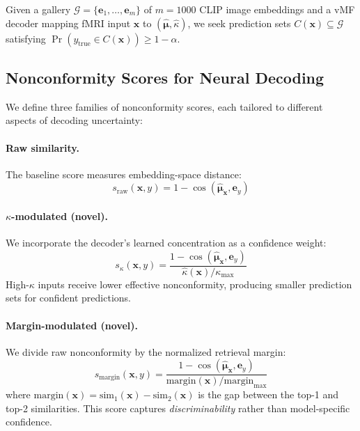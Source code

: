 \documentclass{article}
\begin{document}
Given a gallery $\mathcal{G} = \{\mathbf{e}_1, \ldots, \mathbf{e}_m\}$ of $m=1000$ CLIP image embeddings and a vMF decoder mapping fMRI input $\mathbf{x}$ to $(\hat{\boldsymbol{\mu}}, \hat{\kappa})$, we seek prediction sets $C(\mathbf{x}) \subseteq \mathcal{G}$ satisfying $\Pr(y_{\text{true}} \in C(\mathbf{x})) \geq 1 - \alpha$.

\subsection{Nonconformity Scores for Neural Decoding}
\label{sec:scores}

We define three families of nonconformity scores, each tailored to different aspects of decoding uncertainty:

\paragraph{Raw similarity.} The baseline score measures embedding-space distance:
\begin{equation}
    s_{\text{raw}}(\mathbf{x}, y) = 1 - \cos(\hat{\boldsymbol{\mu}}_\mathbf{x}, \mathbf{e}_y)
\end{equation}

\paragraph{$\kappa$-modulated (novel).} We incorporate the decoder's learned concentration as a confidence weight:
\begin{equation}
    s_{\kappa}(\mathbf{x}, y) = \frac{1 - \cos(\hat{\boldsymbol{\mu}}_\mathbf{x}, \mathbf{e}_y)}{\hat{\kappa}(\mathbf{x}) / \kappa_{\max}}
\end{equation}
High-$\kappa$ inputs receive lower effective nonconformity, producing smaller prediction sets for confident predictions.

\paragraph{Margin-modulated (novel).} We divide raw nonconformity by the normalized retrieval margin:
\begin{equation}
    s_{\text{margin}}(\mathbf{x}, y) = \frac{1 - \cos(\hat{\boldsymbol{\mu}}_\mathbf{x}, \mathbf{e}_y)}{\text{margin}(\mathbf{x}) / \text{margin}_{\max}}
\end{equation}
where $\text{margin}(\mathbf{x}) = \text{sim}_1(\mathbf{x}) - \text{sim}_2(\mathbf{x})$ is the gap between the top-1 and top-2 similarities. This score captures \emph{discriminability} rather than model-specific confidence.
\end{document}
